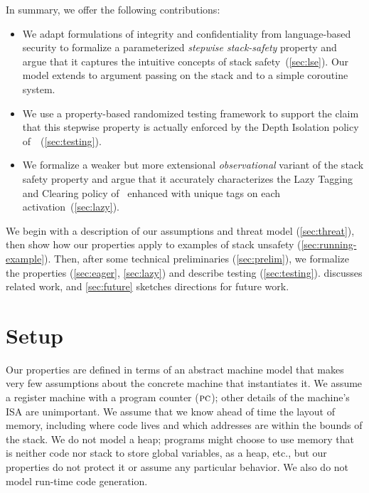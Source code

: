 \documentclass[acmsmall,review,anonymous]{acmart}\settopmatter{printfolios=true,printccs=false,printacmref=false}
\begin{document}
In summary, we offer the following contributions:
\begin{itemize}
\item
  We adapt formulations of integrity and confidentiality from language-based security
  to formalize a parameterized {\em stepwise stack-safety} property and argue that it
  captures the intuitive concepts of stack safety~(\cref{sec:lse}). Our model extends to
  argument passing on the stack and to a simple coroutine system.
\item
  We use a property-based randomized testing framework to support the claim
  that this stepwise property is actually enforced by the Depth Isolation policy
  of~\citet{DBLP:conf/sp/RoesslerD18}~(\cref{sec:testing}).
\item
  We formalize a weaker but more extensional \emph{observational} variant of the
  stack safety property and argue that it accurately characterizes
  the Lazy Tagging and Clearing policy of~\citet{DBLP:conf/sp/RoesslerD18}
  enhanced with unique tags on each activation~(\cref{sec:lazy}).
\end{itemize}

We begin with a description of our assumptions and threat model (\cref{sec:threat}),
then show how our properties apply to examples of stack unsafety
(\cref{sec:running-example}). Then, after some technical preliminaries
(\cref{sec:prelim}), we formalize the properties (\cref{sec:eager}, \cref{sec:lazy})
and describe testing (\cref{sec:testing}).
 discusses related work, and
\cref{sec:future} sketches directions for future work.

\section{Setup}
\label{sec:setup}

Our properties are defined in terms of an abstract machine model that makes very few
assumptions about the concrete machine that instantiates it.  We assume a register
machine with a program counter (\(\textsc{pc}\)); other
details of the machine's ISA are unimportant. We assume that we know ahead of time
the layout of memory, including where code lives and which addresses are within
the bounds of the stack. We do not model a heap; programs might choose to use memory
that is neither code nor stack to store global variables, as a heap, etc., but our
properties do not protect it or assume any particular behavior. We also do not
model run-time code generation.
\end{document}
